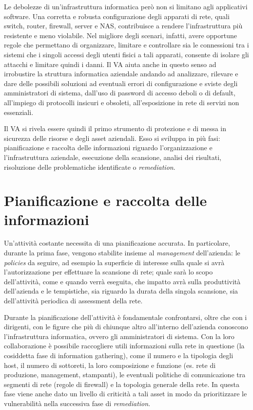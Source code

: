 \documentclass[target=mst,aauheader=]{thud}
\begin{document}
Le debolezze di un’infrastruttura informatica però non si limitano agli applicativi software. Una corretta e robusta configurazione degli apparati di rete, quali switch, router, firewall, server e NAS, contribuisce a rendere l’infrastruttura più resistente e meno violabile. Nel migliore degli scenari, infatti, avere opportune regole che permettano di organizzare, limitare e controllare sia le connessioni tra i sistemi che i singoli accessi degli utenti fisici a tali apparati, consente di isolare gli attacchi e limitare quindi i danni. Il VA aiuta anche in questo senso ad irrobustire la struttura informatica aziendale andando ad analizzare, rilevare e dare delle possibili soluzioni ad eventuali errori di configurazione e sviste degli amministratori di sistema, dall’uso di password di accesso deboli o di default, all’impiego di protocolli insicuri e obsoleti, all’esposizione in rete di servizi non essenziali.

Il VA si rivela essere quindi il primo strumento di protezione e di messa in sicurezza delle risorse e degli asset aziendali. Esso si sviluppa in più fasi: pianificazione e raccolta delle informazioni riguardo l’organizzazione e l’infrastruttura aziendale, esecuzione della scansione, analisi dei risultati, risoluzione delle problematiche identificate o \textit{remediation}.


\section{Pianificazione e raccolta delle informazioni}
Un’attività costante necessita di una pianificazione accurata. In particolare, durante la prima fase, vengono stabilite insieme al \textit{management} dell’azienda: le \textit{policies} da seguire, ad esempio la superficie di interesse sulla quale si avrà l’autorizzazione per effettuare la scansione di rete; quale sarà lo scopo dell’attività, come e quando verrà eseguita, che impatto avrà sulla produttività dell’azienda e le tempistiche, sia riguardo la durata della singola scansione, sia dell’attività periodica di assessment della rete.

Durante la pianificazione dell’attività è fondamentale confrontarsi, oltre che con i dirigenti, con le figure che più di chiunque altro all’interno dell’azienda conoscono l’infrastruttura informatica, ovvero gli amministratori di sistema. Con la loro collaborazione è possibile raccogliere utili informazioni sulla rete in questione (la cosiddetta fase di information gathering), come il numero e la tipologia degli host, il numero di sottoreti, la loro composizione e funzione (es. rete di produzione, management, stampanti), le eventuali politiche di comunicazione tra segmenti di rete (regole di firewall) e la topologia generale della rete. In questa fase viene anche dato un livello di criticità a tali asset in modo da prioritizzare le vulnerabilità nella successiva fase di \textit{remediation}.
\end{document}

